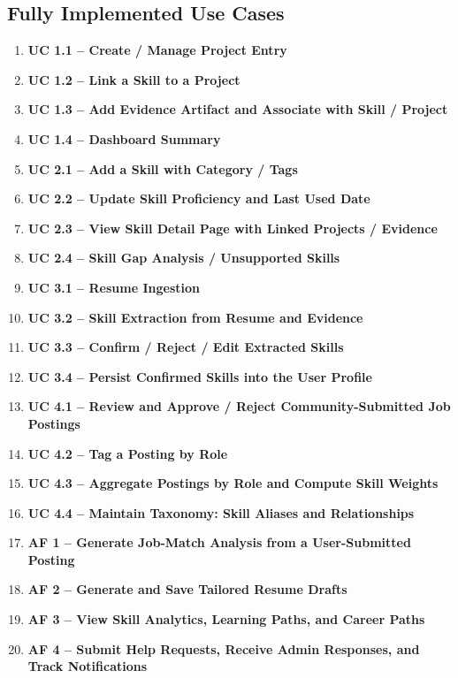 \documentclass[11pt]{article}
\begin{document}
\subsection*{Fully Implemented Use Cases}
\begin{enumerate}
  \item \textbf{UC 1.1 -- Create / Manage Project Entry}
  \item \textbf{UC 1.2 -- Link a Skill to a Project}
  \item \textbf{UC 1.3 -- Add Evidence Artifact and Associate with Skill / Project}
  \item \textbf{UC 1.4 -- Dashboard Summary}
  \item \textbf{UC 2.1 -- Add a Skill with Category / Tags}
  \item \textbf{UC 2.2 -- Update Skill Proficiency and Last Used Date}
  \item \textbf{UC 2.3 -- View Skill Detail Page with Linked Projects / Evidence}
  \item \textbf{UC 2.4 -- Skill Gap Analysis / Unsupported Skills}
  \item \textbf{UC 3.1 -- Resume Ingestion}
  \item \textbf{UC 3.2 -- Skill Extraction from Resume and Evidence}
  \item \textbf{UC 3.3 -- Confirm / Reject / Edit Extracted Skills}
  \item \textbf{UC 3.4 -- Persist Confirmed Skills into the User Profile}
  \item \textbf{UC 4.1 -- Review and Approve / Reject Community-Submitted Job Postings}
  \item \textbf{UC 4.2 -- Tag a Posting by Role}
  \item \textbf{UC 4.3 -- Aggregate Postings by Role and Compute Skill Weights}
  \item \textbf{UC 4.4 -- Maintain Taxonomy: Skill Aliases and Relationships}
  \item \textbf{AF 1 -- Generate Job-Match Analysis from a User-Submitted Posting}
  \item \textbf{AF 2 -- Generate and Save Tailored Resume Drafts}
  \item \textbf{AF 3 -- View Skill Analytics, Learning Paths, and Career Paths}
  \item \textbf{AF 4 -- Submit Help Requests, Receive Admin Responses, and Track Notifications}
\end{enumerate}
\end{document}

